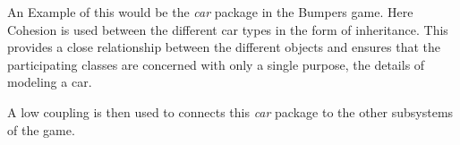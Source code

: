 \documentclass[a4paper, 10pt]{article}
\begin{document}
\begin{enumerate}
        An Example of this would be the \textit{car} package in the Bumpers game. Here Cohesion is used between 
        the different car types in the form of inheritance. This provides a close relationship between the 
        different objects and ensures that the participating classes are concerned with only a single 
        purpose, the details of modeling a car.

        A low coupling is then used to connects this \textit{car} package to the other subsystems of the game.

\end{enumerate}
\end{document}
